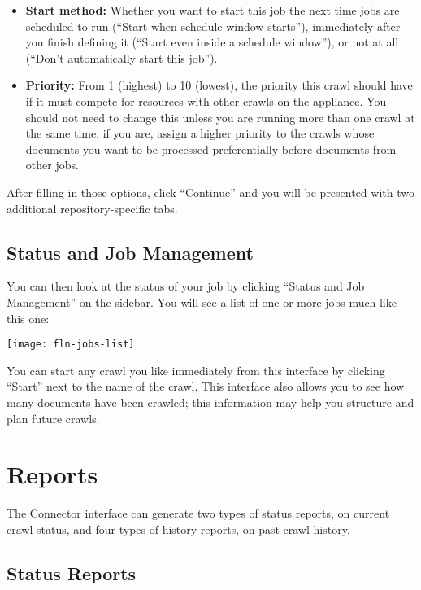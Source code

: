 \begin{changemargin}{1.5in}{0in}
\begin{itemize}
\item \textbf{Start method:} Whether you want to start this job the next
time jobs are scheduled to run (``Start when schedule window starts''),
immediately after you finish defining it (``Start even inside a schedule
window''), or not at all (``Don't automatically start this job'').

\item \textbf{Priority:} From 1 (highest) to 10 (lowest), the priority
this crawl should have if it must compete for resources with other
crawls on the appliance. You should not need to change this unless you
are running more than one crawl at the same time; if you are, assign a
higher priority to the crawls whose documents you want to be processed
preferentially before documents from other jobs.

\end{itemize}

After filling in those options, click ``Continue'' and you will be
presented with two additional repository-specific tabs.



\subsection{\label{ManageJobs}Status and Job Management}

You can then look at the status of your job by clicking ``Status and 
Job Management'' on the sidebar. You will see a list of one or more jobs
much like this one:

\texttt{[image: fln-jobs-list]}

You can start any crawl you like immediately from this interface by
clicking ``Start'' next to the name of the crawl. This interface also
allows you to see how many documents have been crawled; this information
may help you structure and plan future crawls.


\section{Reports}

The Connector interface can generate two types of status reports, on
current crawl status, and four types of history reports, on past crawl
history.

\subsection{Status Reports}


\end{changemargin}

